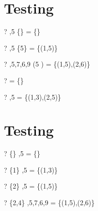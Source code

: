 \documentclass{article}
\begin{document}
\section{Testing \filter}
\begin{zed} \vdash? ,5 \rangle \filter \{\} = \{\} \end{zed}
\begin{zed} \vdash? ,5 \rangle \filter \{5\} = \{(1,5)\} \end{zed}
\begin{zed} \vdash? ,5,7,6,9 \rangle \filter (5 ) = \{(1,5),(2,6)\} \end{zed}
\begin{zed} \vdash? \langle \rangle \filter \nat = \{\} \end{zed}
\begin{zed} \vdash? ,5 \rangle \filter \nat = \{(1,3),(2,5)\} \end{zed}

\section{Testing \filter}
\begin{zed} \vdash? \{\} \extract {},5 \rangle = \{\} \end{zed}
\begin{zed} \vdash? \{1\} \extract {},5 \rangle = \{(1,3)\} \end{zed}
\begin{zed} \vdash? \{2\} \extract {},5 \rangle = \{(1,5)\} \end{zed}
\begin{zed} \vdash? \{2,4\} \extract {},5,7,6,9 \rangle = \{(1,5),(2,6)\} \end{zed}
\end{document}
